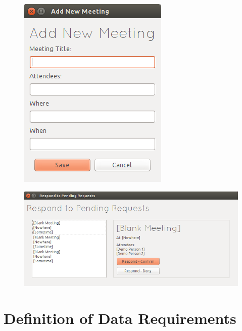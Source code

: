 	\begin{figure}[H]
		\includegraphics[width=\textwidth]{./Design/proto/6.png}
	\end{figure}
	\begin{figure}[H]
		\includegraphics[width=\textwidth]{./Design/proto/7.png}
	\end{figure}

\section{Definition of Data Requirements}

